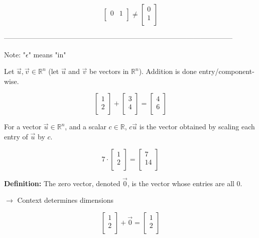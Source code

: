 \documentclass{article}
\begin{document}
\[
\begin{bmatrix}
    0 & 1 \\
\end{bmatrix}
\neq
\begin{bmatrix}
    0 \\
    1 \\
\end{bmatrix}
\]

--------------------------------------------------------------------------------------------------

Note: "\(\epsilon\)" means "in"

Let \(\vec{u}, \vec{v} \in \mathbb{R}^n\) (let \(\vec{u}\) and \(\vec{v}\) be vectors in \(\mathbb{R}^n\)). Addition is done entry/component-wise.

\[
\begin{bmatrix}
    1 \\
    2 \\
\end{bmatrix}
+
\begin{bmatrix}
    3 \\
    4 \\
\end{bmatrix}
=
\begin{bmatrix}
    4 \\
    6 \\
\end{bmatrix}
\]

For a vector \(\vec{u} \in \mathbb{R}^n\), and a scalar \(c \in \mathbb{R}\), \(c\vec{u}\) is the vector obtained by scaling each entry of \(\vec{u}\) by \(c\).

\[
7 \cdot
\begin{bmatrix}
    1 \\
    2 \\
\end{bmatrix}
=
\begin{bmatrix}
    7 \\
    14 \\
\end{bmatrix}
\]

\textbf{Definition:} The zero vector, denoted \(\vec{0}\), is the vector whose entries are all 0.

$\rightarrow$ Context determines dimensions

\[
\begin{bmatrix}
    1 \\
    2 \\
\end{bmatrix}
+
\vec{0}
=
\begin{bmatrix}
    1 \\
    2 \\
\end{bmatrix}
\]
\end{document}
